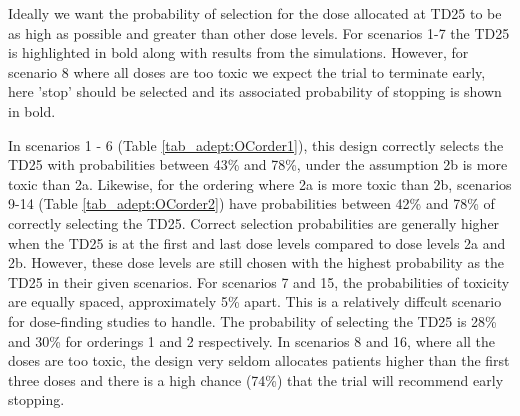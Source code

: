 Ideally we want the probability of selection for the dose allocated at TD25 to be as high as possible and greater than other dose levels. For scenarios 1-7 the TD25 is highlighted in bold along with results from the simulations. However, for scenario 8 where all doses are too toxic we expect the trial to terminate early, here 'stop' should be selected and its associated probability of stopping is shown in bold. 

In scenarios 1 - 6 (Table \ref{tab_adept:OCorder1}), this design correctly selects the TD25 with probabilities between 43\% and 78\%, under the assumption 2b is more toxic than 2a. Likewise, for the ordering where 2a is more toxic than 2b, scenarios 9-14 (Table \ref{tab_adept:OCorder2}) have probabilities between 42\% and 78\% of correctly selecting the TD25. Correct selection probabilities are generally higher when the TD25 is at the first and last dose levels compared to dose levels 2a and 2b. However, these dose levels are still chosen with the highest probability as the TD25 in their given scenarios. For scenarios 7 and 15, the probabilities of toxicity are equally spaced, approximately 5\% apart. This is a relatively diffcult scenario for dose-finding studies to handle. The probability of selecting the TD25 is 28\% and 30\% for orderings 1 and 2 respectively. In scenarios 8 and 16, where all the doses are too toxic, the design very seldom allocates patients higher than the first three doses and there is a high chance (74\%) that the trial will recommend early stopping.



